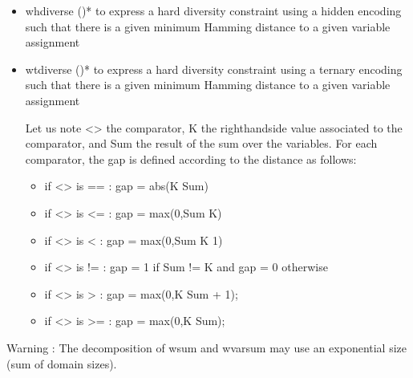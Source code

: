 \documentclass[letterpaper,10pt,openany,oneside,english]{sphinxmanual}
\begin{document}
\begin{fulllineitems}
\begin{itemize}
\begin{itemize}
\item {} 
\sphinxAtStartPar
whdiverse  ()* to express a hard diversity constraint using a hidden encoding such that there is a given minimum Hamming distance to a given variable assignment

\item {} 
\sphinxAtStartPar
wtdiverse  ()* to express a hard diversity constraint using a ternary encoding such that there is a given minimum Hamming distance to a given variable assignment

\sphinxAtStartPar
Let us note \textless{}\textgreater{} the comparator, K the right\sphinxhyphen{}hand\sphinxhyphen{}side value associated to the comparator, and Sum the result of the sum over the variables. For each comparator, the gap is defined according to the distance as follows:\begin{itemize}
\item {} 
\sphinxAtStartPar
if \textless{}\textgreater{} is == : gap = abs(K \sphinxhyphen{} Sum)

\item {} 
\sphinxAtStartPar
if \textless{}\textgreater{} is \textless{}= : gap = max(0,Sum \sphinxhyphen{} K)

\item {} 
\sphinxAtStartPar
if \textless{}\textgreater{} is \textless{} : gap = max(0,Sum \sphinxhyphen{} K \sphinxhyphen{} 1)

\item {} 
\sphinxAtStartPar
if \textless{}\textgreater{} is != : gap = 1 if Sum != K and gap = 0 otherwise

\item {} 
\sphinxAtStartPar
if \textless{}\textgreater{} is \textgreater{} : gap = max(0,K \sphinxhyphen{} Sum + 1);

\item {} 
\sphinxAtStartPar
if \textless{}\textgreater{} is \textgreater{}= : gap = max(0,K \sphinxhyphen{} Sum);

\end{itemize}


\end{itemize}


\end{itemize}


\sphinxAtStartPar
Warning : The decomposition of wsum and wvarsum may use an exponential size (sum of domain sizes).


\end{fulllineitems}
\end{document}
